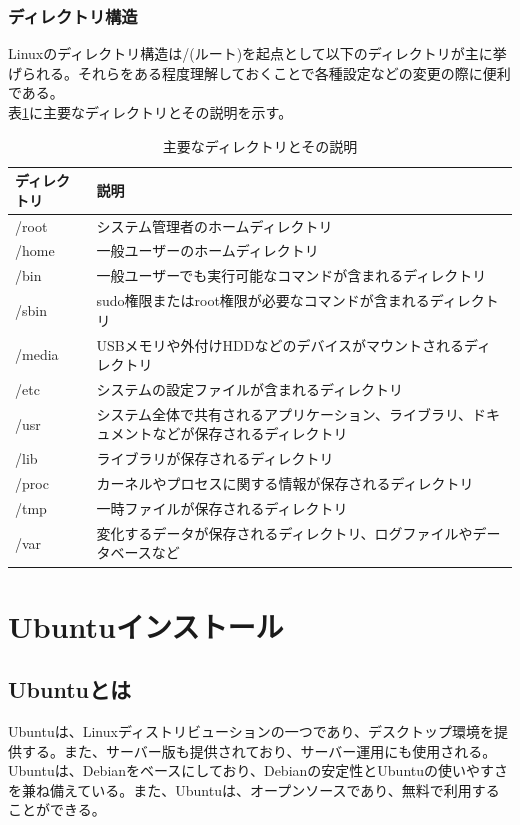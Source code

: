 \documentclass[a4paper, 11pt, dvipdfmx]{jsarticle}
\begin{document}
  \subsubsection{ディレクトリ構造}
  Linuxのディレクトリ構造は/(ルート)を起点として以下のディレクトリが主に挙げられる。それらをある程度理解しておくことで各種設定などの変更の際に便利である。\\
  表\ref{tab:directories}に主要なディレクトリとその説明を示す。
  \begin{table}[H]
    \centering
    \begin{tabular}{|l|l|}
      \hline
      ディレクトリ & 説明 \\ \hline
      /root & システム管理者のホームディレクトリ \\ \hline
      /home & 一般ユーザーのホームディレクトリ \\ \hline
      /bin & 一般ユーザーでも実行可能なコマンドが含まれるディレクトリ \\ \hline
      /sbin & sudo権限またはroot権限が必要なコマンドが含まれるディレクトリ \\ \hline
      /media & USBメモリや外付けHDDなどのデバイスがマウントされるディレクトリ \\ \hline
      /etc & システムの設定ファイルが含まれるディレクトリ \\ \hline
      /usr & システム全体で共有されるアプリケーション、ライブラリ、ドキュメントなどが保存されるディレクトリ \\ \hline
      /lib & ライブラリが保存されるディレクトリ \\ \hline
      /proc & カーネルやプロセスに関する情報が保存されるディレクトリ \\ \hline
      /tmp & 一時ファイルが保存されるディレクトリ \\ \hline
      /var & 変化するデータが保存されるディレクトリ、ログファイルやデータベースなど \\ \hline
    \end{tabular}
    \caption{主要なディレクトリとその説明}
    \label{tab:directories}
  \end{table}


\section{Ubuntuインストール}
\subsection{Ubuntuとは}
Ubuntuは、Linuxディストリビューションの一つであり、デスクトップ環境を提供する。また、サーバー版も提供されており、サーバー運用にも使用される。Ubuntuは、Debianをベースにしており、Debianの安定性とUbuntuの使いやすさを兼ね備えている。また、Ubuntuは、オープンソースであり、無料で利用することができる。\\
\end{document}
